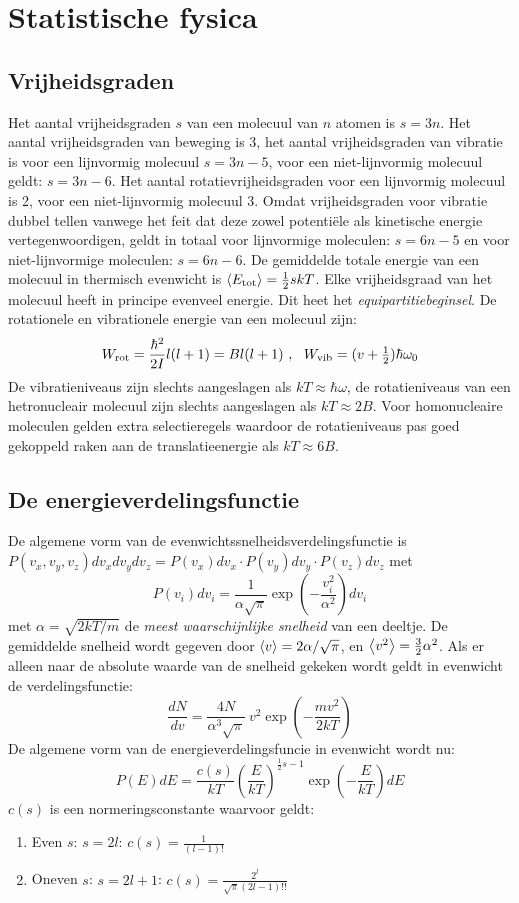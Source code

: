 \chapter{Statistische fysica}
\section{Vrijheidsgraden}
Het aantal vrijheidsgraden $s$ van een molecuul van $n$ atomen is $s=3n$.
Het aantal vrijheidsgraden van beweging is 3, het aantal vrijheidsgraden van
vibratie is voor een lijnvormig molecuul $s=3n-5$, voor een niet-lijnvormig
molecuul geldt: $s=3n-6$. Het aantal rotatievrijheidsgraden voor een
lijnvormig molecuul is 2, voor een niet-lijnvormig molecuul 3.
\npar
Omdat vrijheidsgraden voor vibratie dubbel tellen vanwege het feit dat deze
zowel potenti\"ele als kinetische energie vertegenwoordigen, geldt in totaal
voor lijnvormige moleculen: $s=6n-5$ en voor niet-lijnvormige moleculen:
$s=6n-6$. De gemiddelde totale energie van een molecuul in thermisch evenwicht
is $\left\langle E_{\rm tot} \right\rangle=\frac{1}{2}skT$. Elke vrijheidsgraad van het molecuul
heeft in principe evenveel energie. Dit heet het {\it equipartitiebeginsel}.
\npar
De rotationele en vibrationele energie van een molecuul zijn:
\[
W_{\rm rot}=\frac{\hbar^2}{2I}l(l+1)=Bl(l+1)~,~~W_{\rm vib}=(v+\mbox{$\frac{1}{2}$})\hbar\omega_0
\]
De vibratieniveaus zijn slechts aangeslagen als $kT\approx\hbar\omega$, de
rotatieniveaus van een hetronucleair molecuul zijn slechts aangeslagen als
$kT\approx2B$. Voor homonucleaire moleculen gelden extra selectieregels
waardoor de rotatieniveaus pas goed gekoppeld raken aan de translatieenergie
als $kT\approx6B$.

\section{De energieverdelingsfunctie}
De algemene vorm van de evenwichtssnelheidsverdelingsfunctie is\\
$P(v_x,v_y,v_z)dv_xdv_ydv_z=P(v_x)dv_x\cdot P(v_y)dv_y\cdot P(v_z)dv_z$ met
\[
P(v_i)dv_i=\frac{1}{\alpha\sqrt{\pi}}\exp\left(-\frac{v_i^2}{\alpha^2}\right)dv_i
\]
met $\alpha=\sqrt{2kT/m}$ de {\it meest waarschijnlijke snelheid} van een
deeltje. De gemiddelde snelheid wordt gegeven door $\left\langle v \right\rangle=2\alpha/\sqrt{\pi}$,
en $\left\langle v^2 \right\rangle=\frac{3}{2}\alpha^2$. Als er alleen naar de absolute waarde van de
snelheid gekeken wordt geldt in evenwicht de verdelingsfunctie:
\[
\frac{dN}{dv}=\frac{4N}{\alpha^3\sqrt{\pi}}~v^2\exp\left(-\frac{mv^2}{2kT}\right)
\]
De algemene vorm van de energieverdelingsfuncie in evenwicht wordt nu:
\[
P(E)dE=\frac{c(s)}{kT}\left(\frac{E}{kT}\right)^{\frac{1}{2}s-1}\exp\left(-\frac{E}{kT}\right)dE
\]
$c(s)$ is een normeringsconstante waarvoor geldt:
\begin{enumerate}
\item Even $s$: $s=2l$: $\displaystyle c(s)=\frac{1}{(l-1)!}$
\item Oneven $s$: $s=2l+1$: $\displaystyle c(s)=\frac{2^l}{\sqrt{\pi}(2l-1)!!}$
\end{enumerate}

